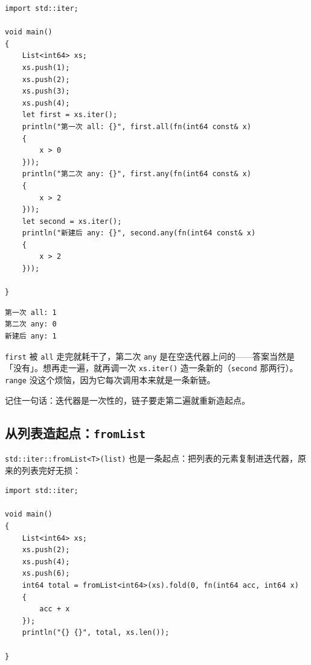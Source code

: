 \par
\medskip
\begin{lstlisting}[style=chali]
import std::iter;

void main()
{
    List<int64> xs;
    xs.push(1);
    xs.push(2);
    xs.push(3);
    xs.push(4);
    let first = xs.iter();
    println("第一次 all: {}", first.all(fn(int64 const& x)
    {
        x > 0
    }));
    println("第二次 any: {}", first.any(fn(int64 const& x)
    {
        x > 2
    }));
    let second = xs.iter();
    println("新建后 any: {}", second.any(fn(int64 const& x)
    {
        x > 2
    }));

}
\end{lstlisting}
\par
\medskip

\par
\medskip
\begin{lstlisting}[style=out]
第一次 all: 1
第二次 any: 0
新建后 any: 1
\end{lstlisting}
\par
\medskip

\texttt{first} 被 \texttt{all} 走完就耗干了，第二次 \texttt{any} 是在空迭代器上问的——答案当然是「没有」。想再走一遍，就再调一次 \texttt{xs.\allowbreak{}iter(\allowbreak{})\allowbreak{}} 造一条新的（\texttt{second} 那两行）。\texttt{range} 没这个烦恼，因为它每次调用本来就是一条新链。

记住一句话：迭代器是一次性的，链子要走第二遍就重新造起点。

\subsection*{从列表造起点：\texttt{from\allowbreak{}List}}

\texttt{std:\allowbreak{}:\allowbreak{}iter:\allowbreak{}:\allowbreak{}from\allowbreak{}List<\allowbreak{}T>\allowbreak{}(\allowbreak{}list)\allowbreak{}} 也是一条起点：把列表的元素复制进迭代器，原来的列表完好无损：

\par
\medskip
\begin{lstlisting}[style=chali]
import std::iter;

void main()
{
    List<int64> xs;
    xs.push(2);
    xs.push(4);
    xs.push(6);
    int64 total = fromList<int64>(xs).fold(0, fn(int64 acc, int64 x)
    {
        acc + x
    });
    println("{} {}", total, xs.len());

}
\end{lstlisting}
\par
\medskip

